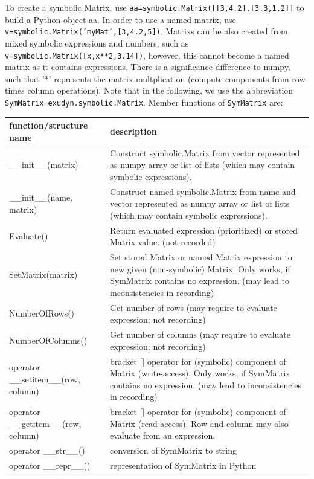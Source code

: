 To create a symbolic Matrix, use \texttt{aa=symbolic.Matrix([[3,4.2],[3.3,1.2]]} to build a Python object aa. In order to use a named matrix, use \texttt{v=symbolic.Matrix('myMat',[3,4.2,5])}. Matrixs can be also created from mixed symbolic expressions and numbers, such as \texttt{v=symbolic.Matrix([x,x**2,3.14])}, however, this cannot become a named matrix as it contains expressions. There is a significance difference to numpy, such that '*' represents the matrix multplication (compute components from row times column operations). Note that in the following, we use the abbreviation \texttt{SymMatrix=exudyn.symbolic.Matrix}. Member functions of \texttt{SymMatrix} are:
\begin{center}
\footnotesize
\begin{longtable}{| p{8cm} | p{8cm} |} 
\hline
{\bf function/structure name} & {\bf description}\\ \hline
  \_\_init\_\_(matrix) & Construct symbolic.Matrix from vector represented as numpy array or list of lists (which may contain symbolic expressions).\\ \hline 
  \_\_init\_\_(name, matrix) & Construct named symbolic.Matrix from name and vector represented as numpy array or list of lists (which may contain symbolic expressions).\\ \hline 
  Evaluate() & Return evaluated expression (prioritized) or stored Matrix value. (not recorded)\\ \hline 
  SetMatrix(matrix) & Set stored Matrix or named Matrix expression to new given (non-symbolic) Matrix. Only works, if SymMatrix contains no expression. (may lead to inconsistencies in recording)\\ \hline 
  NumberOfRows() & Get number of rows (may require to evaluate expression; not recording)\\ \hline 
  NumberOfColumns() & Get number of columns (may require to evaluate expression; not recording)\\ \hline 
  operator \_\_setitem\_\_(row, column) & bracket [] operator for (symbolic) component of Matrix (write-access). Only works, if SymMatrix contains no expression. (may lead to inconsistencies in recording)\\ \hline  
  operator \_\_getitem\_\_(row, column) & bracket [] operator for (symbolic) component of Matrix (read-access). Row and column may also evaluate from an expression.\\ \hline  
  operator \_\_str\_\_() & conversion of SymMatrix to string\\ \hline  
  operator \_\_repr\_\_() & representation of SymMatrix in Python\\ \hline  
\end{longtable}
\end{center}


